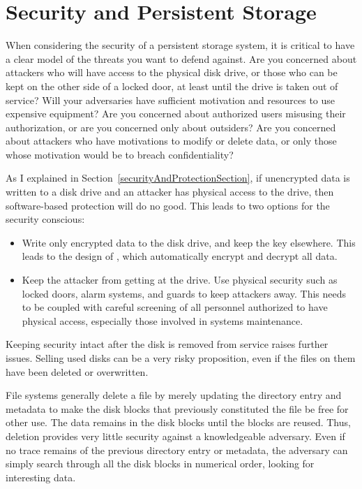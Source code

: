 \section{Security and Persistent Storage}\label{security-persistence-section}

When considering the security of a persistent storage system, it is
critical to have a clear model of the threats you want to defend
against.  Are you concerned about attackers who will have access to
the physical disk drive, or those who can be kept on the other side of
a locked door, at least until the drive is taken out of service? Will
your adversaries have sufficient motivation and resources to use
expensive equipment?  Are you
concerned about authorized users misusing their authorization, or are you concerned only
about outsiders?  Are you concerned about attackers who have
motivations to modify or delete data, or only those whose motivation
would be to breach confidentiality?

As I explained in Section~\ref{securityAndProtectionSection}, if
unencrypted data is written to a disk drive and an attacker has
physical access to the drive, then software-based protection will do
no good.  This leads to two options for the security conscious:
\begin{itemize}
\item
Write only encrypted data to the disk drive, and keep the key
elsewhere.  This leads to the design of
, which automatically encrypt
and decrypt all data.
\item
Keep the attacker from getting at the drive.  Use physical security
such as locked doors, alarm systems, and guards to keep attackers away.  This needs to be coupled with
careful screening of all personnel authorized to have physical access,
especially those involved in systems maintenance. 
\end{itemize}

Keeping security
intact after the disk is removed from service raises further
issues.  Selling used disks
can be a very risky proposition, even if the files on them have
been deleted or overwritten.

File systems generally delete a file by merely updating the directory
entry and metadata to make the disk blocks that previously
constituted the file be free for other use.  The data remains in the
disk blocks until the blocks are reused.  Thus, deletion provides very
little security against a knowledgeable adversary.  Even if no
trace remains of the previous directory entry or metadata, the
adversary can simply search through all the disk blocks in numerical
order, looking for interesting data.

